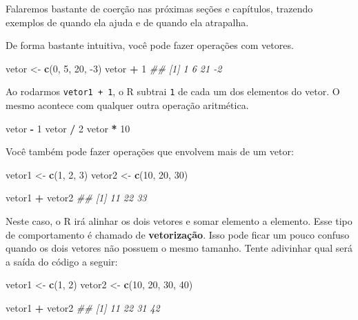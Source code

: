 \documentclass[]{book}
\newenvironment{Shaded}{\begin{snugshade}}{\end{snugshade}}
\newcommand{\CommentTok}[1]{\textcolor[rgb]{0.56,0.35,0.01}{\textit{#1}}}
\newcommand{\DecValTok}[1]{\textcolor[rgb]{0.00,0.00,0.81}{#1}}
\newcommand{\KeywordTok}[1]{\textcolor[rgb]{0.13,0.29,0.53}{\textbf{#1}}}
\newcommand{\NormalTok}[1]{#1}
\newcommand{\OperatorTok}[1]{\textcolor[rgb]{0.81,0.36,0.00}{\textbf{#1}}}
\newcommand{\StringTok}[1]{\textcolor[rgb]{0.31,0.60,0.02}{#1}}
\begin{document}
Falaremos bastante de coerção nas próximas seções e capítulos, trazendo exemplos de quando ela ajuda e de quando ela atrapalha.

De forma bastante intuitiva, você pode fazer operações com vetores.

\begin{Shaded}
\begin{Highlighting}[]
\NormalTok{vetor <-}\StringTok{ }\KeywordTok{c}\NormalTok{(}\DecValTok{0}\NormalTok{, }\DecValTok{5}\NormalTok{, }\DecValTok{20}\NormalTok{, }\DecValTok{-3}\NormalTok{)}
\NormalTok{vetor }\OperatorTok{+}\StringTok{ }\DecValTok{1}
\CommentTok{## [1]  1  6 21 -2}
\end{Highlighting}
\end{Shaded}

Ao rodarmos \texttt{vetor1\ +\ 1}, o R subtrai \texttt{1} de cada um dos elementos do vetor. O mesmo acontece com qualquer outra operação aritmética.

\begin{Shaded}
\begin{Highlighting}[]
\NormalTok{vetor }\OperatorTok{-}\StringTok{ }\DecValTok{1}
\NormalTok{vetor }\OperatorTok{/}\StringTok{ }\DecValTok{2}
\NormalTok{vetor }\OperatorTok{*}\StringTok{ }\DecValTok{10}
\end{Highlighting}
\end{Shaded}

Você também pode fazer operações que envolvem mais de um vetor:

\begin{Shaded}
\begin{Highlighting}[]
\NormalTok{vetor1 <-}\StringTok{ }\KeywordTok{c}\NormalTok{(}\DecValTok{1}\NormalTok{, }\DecValTok{2}\NormalTok{, }\DecValTok{3}\NormalTok{)}
\NormalTok{vetor2 <-}\StringTok{ }\KeywordTok{c}\NormalTok{(}\DecValTok{10}\NormalTok{, }\DecValTok{20}\NormalTok{, }\DecValTok{30}\NormalTok{)}

\NormalTok{vetor1  }\OperatorTok{+}\StringTok{ }\NormalTok{vetor2}
\CommentTok{## [1] 11 22 33}
\end{Highlighting}
\end{Shaded}

Neste caso, o R irá alinhar os dois vetores e somar elemento a elemento. Esse tipo de comportamento é chamado de \textbf{vetorização}. Isso pode ficar um pouco confuso quando os dois vetores não possuem o mesmo tamanho. Tente adivinhar qual será a saída do código a seguir:

\begin{Shaded}
\begin{Highlighting}[]
\NormalTok{vetor1 <-}\StringTok{ }\KeywordTok{c}\NormalTok{(}\DecValTok{1}\NormalTok{, }\DecValTok{2}\NormalTok{)}
\NormalTok{vetor2 <-}\StringTok{ }\KeywordTok{c}\NormalTok{(}\DecValTok{10}\NormalTok{, }\DecValTok{20}\NormalTok{, }\DecValTok{30}\NormalTok{, }\DecValTok{40}\NormalTok{)}

\NormalTok{vetor1 }\OperatorTok{+}\StringTok{ }\NormalTok{vetor2}
\CommentTok{## [1] 11 22 31 42}
\end{Highlighting}
\end{Shaded}
\end{document}
